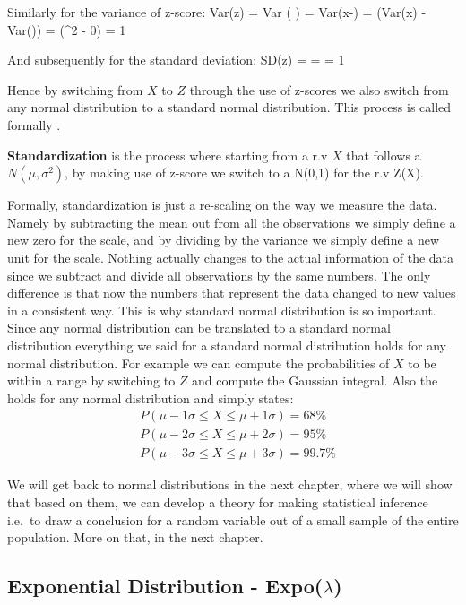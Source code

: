 Similarly for the variance of z-score:
\bse
Var(z) = Var \Big(  \Big) =  Var(x-\mu)
=  (Var(x) - Var(\mu)) =  (\sigma^2 - 0) = 1
\ese

And subsequently for the standard deviation:
\bse
SD(z) =  =  = 1
\ese

Hence by switching from $X$ to $Z$ through the use of z-scores we also switch from any normal distribution to a
standard normal distribution. This process is called formally .

\bd[Standardization]
\textbf{Standardization} is the process where starting from a r.v $X$ that follows a $N(\mu, \sigma^2)$, by making
use of z-score we switch to a N(0,1) for the r.v Z(X).
\ed

Formally, standardization is just a re-scaling on the way we measure the data. Namely by subtracting the mean out
from all the observations we simply define a new zero for the scale, and by dividing by the variance we simply define
a new unit for the scale. Nothing actually changes to the actual information of the data since we subtract and divide
all observations by the same numbers. The only difference is that now the numbers that represent the data changed to
new values in a consistent way. This is why standard normal distribution is so important. Since any normal
distribution can be translated to a standard normal distribution everything we said for a standard normal
distribution holds for any normal distribution. For example we can compute the probabilities of $X$ to be within a
range by switching to $Z$ and compute the Gaussian integral. Also the  holds for any normal
distribution and simply states:
\begin{align*}
& P(\mu -1\sigma \leq X\leq \mu +1\sigma ) = 68\% \\
& P(\mu -2\sigma \leq X\leq \mu +2\sigma ) = 95\% \\
& P(\mu -3\sigma \leq X\leq \mu +3\sigma ) = 99.7\%
\end{align*}

We will get back to normal distributions in the next chapter, where we will show that based on them, we can develop a
theory for making statistical inference i.e.\ to draw a conclusion for a random variable out of a small sample of the
entire population. More on that, in the next chapter.

\subsection{Exponential Distribution - Expo($\lambda$)}

